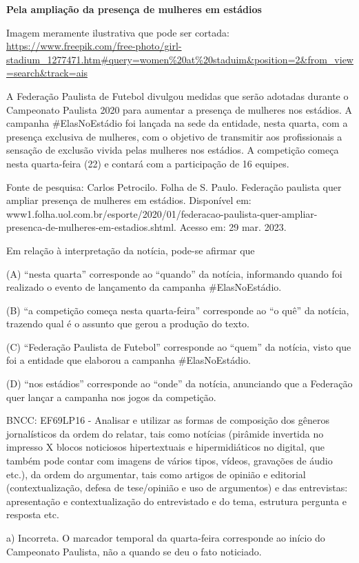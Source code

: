 \begin{itemize}
\begin{itemize}
{\begin{itemize}
\textbf{Pela ampliação da presença de mulheres em estádios}

Imagem meramente ilustrativa que pode ser cortada:
\url{https://www.freepik.com/free-photo/girl-stadium_1277471.htm\#query=women\%20at\%20staduim\&position=2\&from_view=search\&track=ais}

A Federação Paulista de Futebol divulgou medidas que serão adotadas
durante o Campeonato Paulista 2020 para aumentar a presença de mulheres
nos estádios. A campanha \#ElasNoEstádio foi lançada na sede da
entidade, nesta quarta, com a presença exclusiva de mulheres, com o
objetivo de transmitir aos profissionais a sensação de exclusão vivida
pelas mulheres nos estádios. A competição começa nesta quarta-feira (22)
e contará com a participação de 16 equipes.

Fonte de pesquisa: Carlos Petrocilo. Folha de S. Paulo. Federação
paulista quer ampliar presença de mulheres em estádios. Disponível em:
www1.folha.uol.com.br/esporte/2020/01/federacao-paulista-quer-ampliar-presenca-de-mulheres-em-estadios.shtml.
Acesso em: 29 mar. 2023.

Em relação à interpretação da notícia, pode-se afirmar que

(A) ``nesta quarta'' corresponde ao ``quando'' da notícia, informando
quando foi realizado o evento de lançamento da campanha \#ElasNoEstádio.

(B) ``a competição começa nesta quarta-feira'' corresponde ao ``o quê''
da notícia, trazendo qual é o assunto que gerou a produção do texto.

(C) ``Federação Paulista de Futebol'' corresponde ao ``quem'' da
notícia, visto que foi a entidade que elaborou a campanha
\#ElasNoEstádio.

(D) ``nos estádios'' corresponde ao ``onde'' da notícia, anunciando que
a Federação quer lançar a campanha nos jogos da competição.

BNCC: EF69LP16 - Analisar e utilizar as formas de composição dos gêneros
jornalísticos da ordem do relatar, tais como notícias (pirâmide
invertida no impresso X blocos noticiosos hipertextuais e
hipermidiáticos no digital, que também pode contar com imagens de vários
tipos, vídeos, gravações de áudio etc.), da ordem do argumentar, tais
como artigos de opinião e editorial (contextualização, defesa de
tese/opinião e uso de argumentos) e das entrevistas: apresentação e
contextualização do entrevistado e do tema, estrutura pergunta e
resposta etc.

a) Incorreta. O marcador temporal da quarta-feira corresponde ao início
do Campeonato Paulista, não a quando se deu o fato noticiado.


\end{itemize}}
\end{itemize}
\end{itemize}
